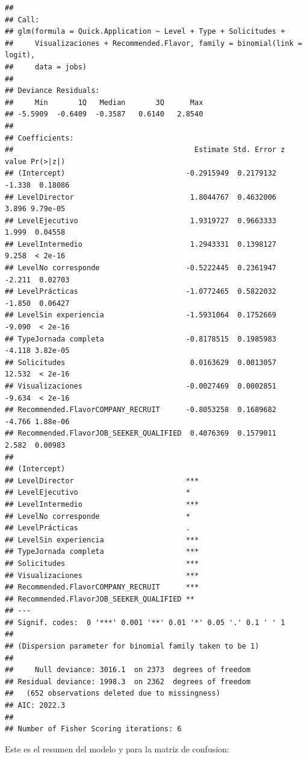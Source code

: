 \documentclass[
]{article}
\begin{document}
\begin{verbatim}
## 
## Call:
## glm(formula = Quick.Application ~ Level + Type + Solicitudes + 
##     Visualizaciones + Recommended.Flavor, family = binomial(link = logit), 
##     data = jobs)
## 
## Deviance Residuals: 
##     Min       1Q   Median       3Q      Max  
## -5.5909  -0.6409  -0.3587   0.6140   2.8540  
## 
## Coefficients:
##                                          Estimate Std. Error z value Pr(>|z|)
## (Intercept)                            -0.2915949  0.2179132  -1.338  0.18086
## LevelDirector                           1.8044767  0.4632006   3.896 9.79e-05
## LevelEjecutivo                          1.9319727  0.9663333   1.999  0.04558
## LevelIntermedio                         1.2943331  0.1398127   9.258  < 2e-16
## LevelNo corresponde                    -0.5222445  0.2361947  -2.211  0.02703
## LevelPrácticas                         -1.0772465  0.5822032  -1.850  0.06427
## LevelSin experiencia                   -1.5931064  0.1752669  -9.090  < 2e-16
## TypeJornada completa                   -0.8178515  0.1985983  -4.118 3.82e-05
## Solicitudes                             0.0163629  0.0013057  12.532  < 2e-16
## Visualizaciones                        -0.0027469  0.0002851  -9.634  < 2e-16
## Recommended.FlavorCOMPANY_RECRUIT      -0.8053258  0.1689682  -4.766 1.88e-06
## Recommended.FlavorJOB_SEEKER_QUALIFIED  0.4076369  0.1579011   2.582  0.00983
##                                           
## (Intercept)                               
## LevelDirector                          ***
## LevelEjecutivo                         *  
## LevelIntermedio                        ***
## LevelNo corresponde                    *  
## LevelPrácticas                         .  
## LevelSin experiencia                   ***
## TypeJornada completa                   ***
## Solicitudes                            ***
## Visualizaciones                        ***
## Recommended.FlavorCOMPANY_RECRUIT      ***
## Recommended.FlavorJOB_SEEKER_QUALIFIED ** 
## ---
## Signif. codes:  0 '***' 0.001 '**' 0.01 '*' 0.05 '.' 0.1 ' ' 1
## 
## (Dispersion parameter for binomial family taken to be 1)
## 
##     Null deviance: 3016.1  on 2373  degrees of freedom
## Residual deviance: 1998.3  on 2362  degrees of freedom
##   (652 observations deleted due to missingness)
## AIC: 2022.3
## 
## Number of Fisher Scoring iterations: 6
\end{verbatim}

Este es el resumen del modelo y para la matriz de confusion:
\end{document}
